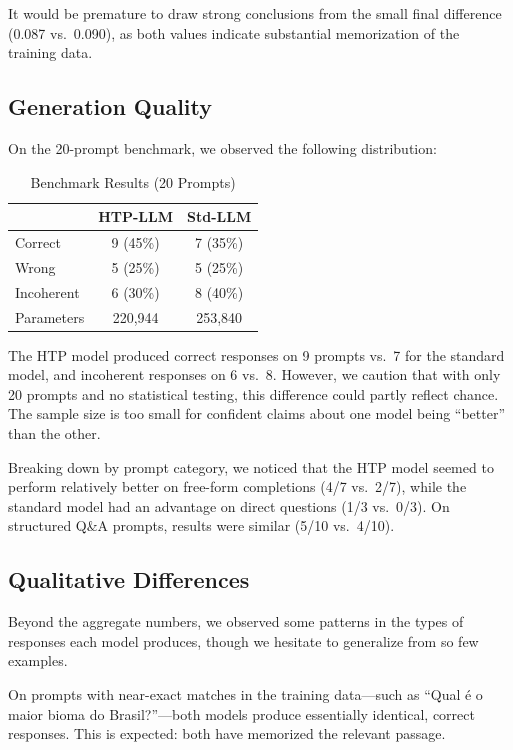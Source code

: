 \documentclass[10pt,twocolumn,a4paper]{article}
\newcommand{\htpname}{HTP}
\newcommand{\htpmodel}{HTP-LLM}
\newcommand{\stdmodel}{Std-LLM}
\begin{document}
It would be premature to draw strong conclusions from the small final difference (0.087 vs.\ 0.090), as both values indicate substantial memorization of the training data.

\subsection{Generation Quality}

On the 20-prompt benchmark, we observed the following distribution:

\begin{table}[h]
\centering
\caption{Benchmark Results (20 Prompts)}
\label{tab:aggregate}
\begin{tabular}{lcc}
\toprule
& \textbf{\htpmodel{}} & \textbf{\stdmodel{}} \\
\midrule
Correct & 9 (45\%) & 7 (35\%) \\
Wrong & 5 (25\%) & 5 (25\%) \\
Incoherent & 6 (30\%) & 8 (40\%) \\
\midrule
Parameters & 220,944 & 253,840 \\
\bottomrule
\end{tabular}
\end{table}

The \htpname{} model produced correct responses on 9 prompts vs.\ 7 for the standard model, and incoherent responses on 6 vs.\ 8. However, we caution that with only 20 prompts and no statistical testing, this difference could partly reflect chance. The sample size is too small for confident claims about one model being ``better'' than the other.

Breaking down by prompt category, we noticed that the \htpname{} model seemed to perform relatively better on free-form completions (4/7 vs.\ 2/7), while the standard model had an advantage on direct questions (1/3 vs.\ 0/3). On structured Q\&A prompts, results were similar (5/10 vs.\ 4/10).

\subsection{Qualitative Differences}

Beyond the aggregate numbers, we observed some patterns in the types of responses each model produces, though we hesitate to generalize from so few examples.

On prompts with near-exact matches in the training data---such as ``Qual \'e o maior bioma do Brasil?''---both models produce essentially identical, correct responses. This is expected: both have memorized the relevant passage.
\end{document}
